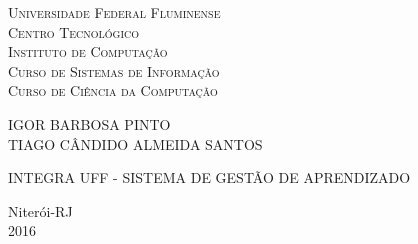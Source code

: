 
\begin{titlepage}
  \begin{center}
    \Large{\textsc{Universidade Federal Fluminense} \\
           \textsc{Centro Tecnológico} \\ 
           \textsc{Instituto de Computação} \\
           \textsc{Curso de Sistemas de Informação} \\
            \textsc{Curso de Ciência da Computação}
          }
    \par\vfill
    \LARGE{IGOR BARBOSA PINTO}\\
    \LARGE{TIAGO CÂNDIDO ALMEIDA SANTOS}
    \par\vfill
    \LARGE{INTEGRA UFF - SISTEMA DE GESTÃO DE APRENDIZADO}
    \par\vfill
    \Large{Niterói-RJ\\2016}
  \end{center}
\end{titlepage}